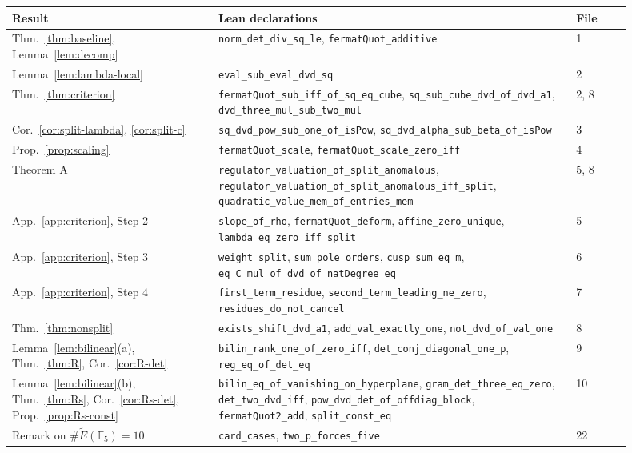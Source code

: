 \documentclass[11pt,a4paper]{amsart}
\newcommand{\lean}[1]{\nolinkurl{#1}}
\newcommand{\F}{\mathbb{F}}
\newcommand{\Et}{\widetilde{E}}
\theoremstyle{plain}
\theoremstyle{definition}
\theoremstyle{remark}
\begin{document}
\begin{center}\small
\begin{longtable}{p{0.3\linewidth}p{0.52\linewidth}p{0.08\linewidth}}
\toprule
Result & Lean declarations & File\\
\midrule
Thm.~\ref{thm:baseline}, Lemma~\ref{lem:decomp} & \lean{norm_det_div_sq_le}, \lean{fermatQuot_additive} & 1\\
Lemma~\ref{lem:lambda-local} & \lean{eval_sub_eval_dvd_sq} & 2\\
Thm.~\ref{thm:criterion} & \lean{fermatQuot_sub_iff_of_sq_eq_cube}, \lean{sq_sub_cube_dvd_of_dvd_a1}, \lean{dvd_three_mul_sub_two_mul} & 2, 8\\
Cor.~\ref{cor:split-lambda}, \ref{cor:split-c} & \lean{sq_dvd_pow_sub_one_of_isPow}, \lean{sq_dvd_alpha_sub_beta_of_isPow} & 3\\
Prop.~\ref{prop:scaling} & \lean{fermatQuot_scale}, \lean{fermatQuot_scale_zero_iff} & 4\\
Theorem A & \lean{regulator_valuation_of_split_anomalous}, \lean{regulator_valuation_of_split_anomalous_iff_split}, \lean{quadratic_value_mem_of_entries_mem} & 5, 8\\
App.~\ref{app:criterion}, Step 2 & \lean{slope_of_rho}, \lean{fermatQuot_deform}, \lean{affine_zero_unique}, \lean{lambda_eq_zero_iff_split} & 5\\
App.~\ref{app:criterion}, Step 3 & \lean{weight_split}, \lean{sum_pole_orders}, \lean{cusp_sum_eq_m}, \lean{eq_C_mul_of_dvd_of_natDegree_eq} & 6\\
App.~\ref{app:criterion}, Step 4 & \lean{first_term_residue}, \lean{second_term_leading_ne_zero}, \lean{residues_do_not_cancel} & 7\\
Thm.~\ref{thm:nonsplit} & \lean{exists_shift_dvd_a1}, \lean{add_val_exactly_one}, \lean{not_dvd_of_val_one} & 8\\
Lemma~\ref{lem:bilinear}(a), Thm.~\ref{thm:R}, Cor.~\ref{cor:R-det} & \lean{bilin_rank_one_of_zero_iff}, \lean{det_conj_diagonal_one_p}, \lean{reg_eq_of_det_eq} & 9\\
Lemma~\ref{lem:bilinear}(b), Thm.~\ref{thm:Rs}, Cor.~\ref{cor:Rs-det}, Prop.~\ref{prop:Rs-const} & \lean{bilin_eq_of_vanishing_on_hyperplane}, \lean{gram_det_three_eq_zero}, \lean{det_two_dvd_iff}, \lean{pow_dvd_det_of_offdiag_block}, \lean{fermatQuot2_add}, \lean{split_const_eq} & 10\\
Remark on $\#\Et(\F_5)=10$ & \lean{card_cases}, \lean{two_p_forces_five} & 22\\
\bottomrule
\end{longtable}
\end{center}
\end{document}

